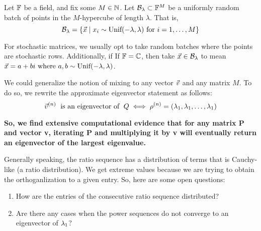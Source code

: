 \begin{definition}
Let $\F$ be a field, and fix some $M \in \N$. Let $\B_\lambda \subset \F^M$ be a uniformly random batch of points in the $M$-hypercube of length $\lambda$. That is,
$$\B_\lambda = \{\vec{x} \mid x_i \sim \text{Unif}(-\lambda, \lambda) \text{ for } i = \oneto[M]\}$$
\end{definition}

For stochastic matrices, we usually opt to take random batches where the points are stochastic rows.
Additionally, if If $\F = \mathbb{C}$, then take $\vec{x} \in \B_\lambda$ to mean $\vec{x} = a + bi \text{ where } a,b \sim \Unif(-\lambda,\lambda)$.


We could generalize the notion of mixing to any vector $\vvec$ and any matrix $M$.
To do so, we rewrite the approximate eigenvector statement as follows:
$$\vvecn{n} \text{\; is an eigenvector of \;} Q \iff \rvecn{n} = (\l_1, \l_1, \dots, \l_1)$$

\textbf{So, we find extensive computational evidence that for any matrix P and vector v, iterating P and multiplying it by v will eventually return an eigenvector of the largest eigenvalue.}



Generally speaking, the ratio sequence has a distribution of terms that is Cauchy-like (a ratio distribution).
We get extreme values because we are trying to obtain the orthoganlization to a given entry. So, here are some open questions:

\begin{enumerate}
  \item How are the entries of the consecutive ratio sequence distributed?
  \item Are there any cases when the power sequences do not converge to an eigenvector of $\l_1$?
\end{enumerate}
